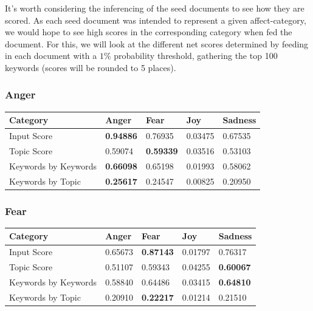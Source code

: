 \documentclass[11pt, twoside, reqno]{book}
\begin{document}
It's worth considering the inferencing of the seed documents to see how they are scored. As each seed document was intended to represent a given affect-category, we would hope to see high scores in the corresponding category when fed the document. For this, we will look at the different net scores determined by feeding in each document with a $1\%$ probability threshold, gathering the top 100 keywords (scores will be rounded to 5 places).

\subsubsection{\textbf{Anger}}

\begin{table}[h!]
    \raggedright
    \begin{tabular}{|l|l|l|l|l|}
    \hline
    Category & Anger & Fear & Joy & Sadness \\\hline
    Input Score & \textbf{0.94886} & 0.76935 & 0.03475 & 0.67535 \\\hline
    Topic Score & 0.59074 & \textbf{0.59339} & 0.03516 & 0.53103 \\\hline
    Keywords by Keywords & \textbf{0.66098} & 0.65198 & 0.01993 & 0.58062 \\\hline
    Keywords by Topic & \textbf{0.25617} & 0.24547 & 0.00825 & 0.20950 \\\hline
    \end{tabular}
\end{table}

\subsubsection{\textbf{Fear}}

\begin{table}[h!]
    \raggedright
    \begin{tabular}{|l|l|l|l|l|}
    \hline
    Category & Anger & Fear & Joy & Sadness \\\hline
    Input Score & 0.65673 & \textbf{0.87143} & 0.01797 & 0.76317 \\\hline
    Topic Score & 0.51107 & 0.59343 & 0.04255 & \textbf{0.60067} \\\hline
    Keywords by Keywords & 0.58840 & 0.64486 & 0.03415 & \textbf{0.64810} \\\hline
    Keywords by Topic & 0.20910 & \textbf{0.22217} & 0.01214 & 0.21510 \\\hline
    \end{tabular}
\end{table}
\end{document}
